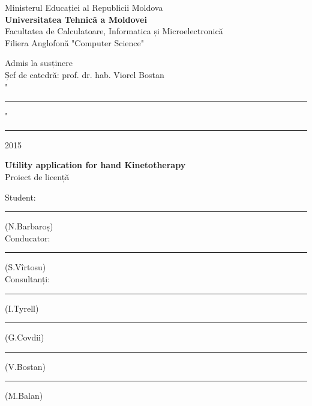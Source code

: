 \begin{titlepage}

\newcommand{\HRule}{\rule{\linewidth}{0.5mm}} %

\center %
 

Ministerul Educației al Republicii Moldova\\ %
\textbf{Universitatea Tehnică a Moldovei}\\%
Facultatea de Calculatoare, Informatica și Microelectronică\\
Filiera Anglofonă "Computer Science"\\


\vspace{2cm}



\hfill Admis la susținere\\
\hfill Șef de catedră: prof. dr. hab. Viorel Bostan\\

\vspace{0.4cm}
\hfill "\rule{0.75cm}{0.2mm}" \ \rule{3cm}{0.2mm} 2015
\vspace{3cm}




\begin{center}
{\LARGE \textbf{Utility application for hand Kinetotherapy}}\\
\vspace{0.6cm}
Proiect de licență
\end{center}
\vspace{1cm}


\hfill Student: \rule{3.9cm}{0.2mm}(N.Barbaroș)\\
\vspace{0.2cm}
\hfill Conducator: \rule{4cm}{0.2mm}(S.Vîrtosu)\\
\vspace{0.2cm}
\hfill Consultanți: \rule{4.2cm}{0.2mm}(I.Tyrell)\\
\vspace{0.2cm}
\hfill \rule{4cm}{0.2mm}(G.Covdii)\\
\vspace{0.2cm}
\hfill \rule{3.9cm}{0.2mm}(V.Bostan)\\
\vspace{0.2cm}
\hfill \rule{4cm}{0.2mm}(M.Balan)\\
\vspace{4cm}




\end{titlepage}
